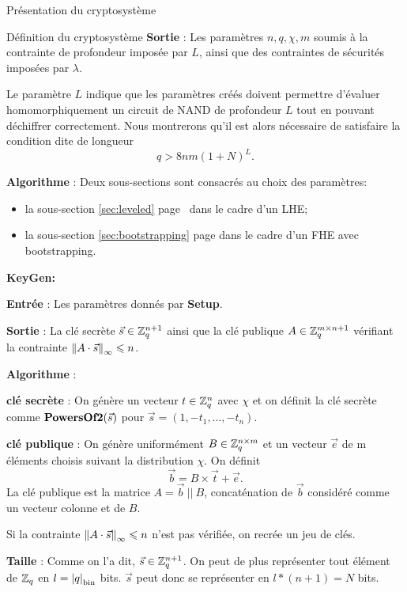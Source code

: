 \begin{section}{Présentation du cryptosystème}
\begin{subsection}{Définition du cryptosystème}
	\textbf{Sortie} : Les paramètres $n, q, \chi, m$ soumis à la contrainte de profondeur imposée par $L$, ainsi que
	des contraintes de sécurités imposées par $\lambda$.

	Le paramètre $L$ indique que les paramètres créés doivent permettre d'évaluer homomorphiquement un circuit de NAND de profondeur $L$ tout en pouvant déchiffrer correctement. Nous montrerons qu'il est alors nécessaire de satisfaire la condition dite \og de longueur \fg~  
	\begin{equation}\label{eq:longueur} q > 8nm (1 + N)^L. \end{equation}

	\textbf{Algorithme} : Deux sous-sections sont consacrés au choix des paramètres:
	\begin{itemize}
	\item la sous-section \ref{sec:leveled} page \pageref{sec:leveled} dans le cadre d'un LHE;
	\item la sous-section \ref{sec:bootstrapping} page \pageref{sec:bootstrapping} dans le cadre d'un FHE avec
	bootstrapping.
	\end{itemize}
	
\begin{samepage}
\vspace{0.5cm}\noindent\textbf{KeyGen:}
\flushleft
	
	\textbf{Entrée} : Les paramètres donnés par \textbf{Setup}.

	\textbf{Sortie} : La clé secrète $\vec{s} \in
	\mathbb{Z}_q^{n+1}$ ainsi que la clé publique $A \in \mathbb{Z}_q^{m \times n+1}$ vérifiant la contrainte 
	${\|A \cdot \vec{s}\|}_{\infty} \leqslant n$.
\end{samepage}

	\textbf{Algorithme} :

	\textbf{clé secrète} : On génère un vecteur $t \in \mathbb{Z}_q^n$ avec $\chi$ et on définit la clé secrète comme $\text{\textbf{PowersOf2}}(\vec{s})$ pour $\vec{s} = (1, -t_1, ..., -t_n)$.

	\textbf{clé publique} : On génère uniformément $B \in \mathbb{Z}_q^{n \times m}$ et un vecteur $\vec{e}$ de m éléments
	choisis suivant la distribution $\chi$. On définit 
	\[\vec{b} = B \times \vec{t} + \vec{e}.\]
	La clé publique est la matrice $A = \vec{b}\: || \:B$, concaténation de $\vec{b}$ considéré comme
	un vecteur colonne et de $B$.

	Si la contrainte ${\|A \cdot \vec{s}\|}_{\infty} \leqslant n$ n'est pas vérifiée, on recrée un jeu de clés.

	\textbf{Taille} : Comme on l'a dit, $\vec{s} \in \mathbb{Z}_q^{n+1}$. On peut de plus représenter tout élément de
	$\mathbb{Z}_q$ en $l = {|q|}_{\text{bin}}$ bits.  $\vec{s}$ peut donc se représenter en  $l * (n+1) = N$ bits.


\end{subsection}
\end{section}
